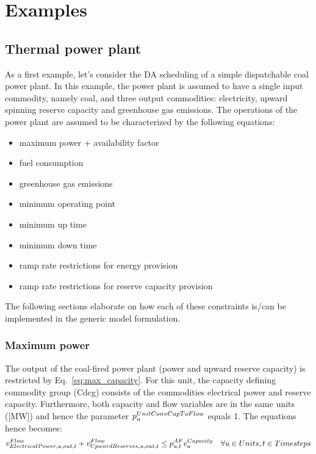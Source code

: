 \documentclass[10pt,english]{article}
\begin{document}
\clearpage
\section{Examples}

\subsection{Thermal power plant}
As a first example, let's consider the DA scheduling of a simple dispatchable coal power plant. In this example, the power plant is assumed to have a single input commodity, namely coal, and three output commodities: electricity, upward spinning reserve capacity and greenhouse gas emissions. The operations of the power plant are assumed to be characterized by the following equations:
\begin{itemize}
\item maximum power + availability factor 
\item fuel consumption
\item greenhouse gas emissions
\item minimum operating point
\item minimum up time
\item minimum down time
\item ramp rate restrictions for energy provision
\item ramp rate restrictions for reserve capacity provision
\end{itemize}

The following sections elaborate on how each of these constraints is/can be implemented in the generic model formulation.

\subsubsection{Maximum power}
The output of the coal-fired power plant (power and upward reserve capacity) is restricted by Eq.~\eqref{eq:max_capacity}. For this unit, the capacity defining commodity group (Cdcg) consists of the commodities electrical power and reserve capacity. Furthermore, both capacity and flow variables are in the same units ([MW]) and hence the parameter $\pUnitConvCapToFlow$ equals 1. The equations hence becomes:
\begin{align}
\vFlow[ElectricalPower,u,out,t] + \vFlow[UpwardReserves,u,out,t] \le \pAF \vCapacity \quad \forall \units, \timesteps \nonumber
\end{align}
\end{document}
